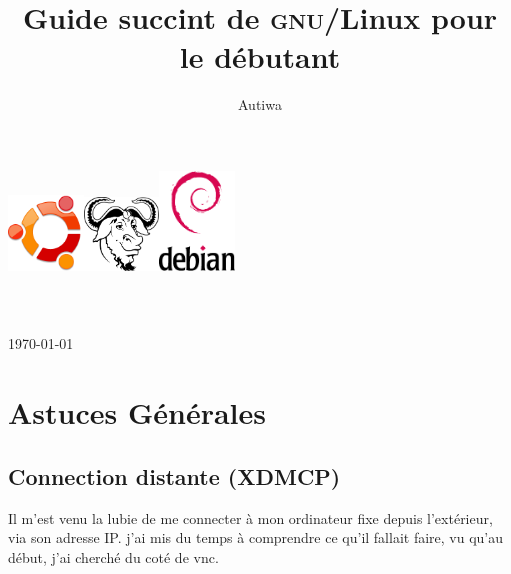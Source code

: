 \documentclass[a4paper,twoside]{article}
\title{Guide succint de \textsc{gnu}/Linux pour le débutant}
\author{Autiwa}
\begin{document}
\begin{titlepage}

\begin{center}

\vfill
\includegraphics[width=0.15\textwidth]{figure/logo-ubuntu.pdf}\hfill\includegraphics[width=0.15\textwidth]{figure/logo-GNU.pdf}\hfill\includegraphics[width=0.15\textwidth]{figure/logo-debian.pdf}\\[1cm]

\HRule \\[0.4cm]
{ \huge \bfseries \makeatletter\@title\makeatother}\\[0.4cm]

\HRule \\[0.75cm]
{\large \today}\\[0.75cm]
\makeatletter
\@author
\makeatother
\vfill
{}
\vfill



\end{center}

\end{titlepage}

\tableofcontents
\newpage



\section{Astuces Générales}
\subsection{Connection distante (XDMCP)}
Il m'est venu la lubie de me connecter à mon ordinateur fixe depuis l'extérieur, via son adresse IP. j'ai mis du temps à comprendre ce qu'il fallait faire, vu qu'au début, j'ai cherché du coté de vnc.
\end{document}
